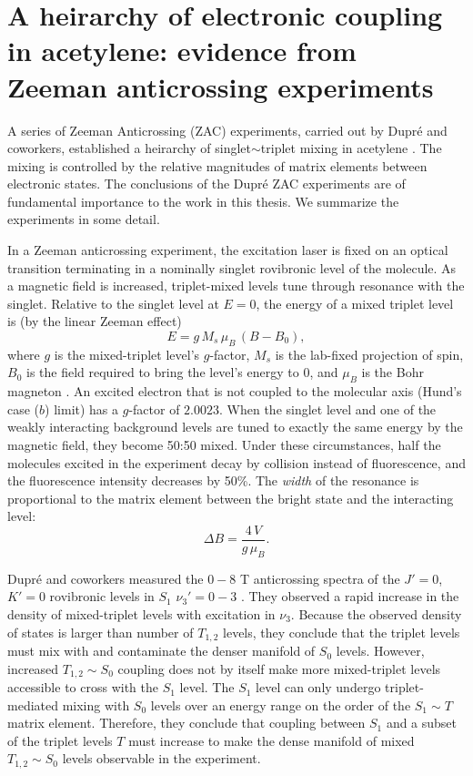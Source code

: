 \documentclass[12pt]{mitthesis}
\begin{document}
\section{A heirarchy of electronic coupling in acetylene: evidence from
  Zeeman anticrossing experiments}

A series of Zeeman Anticrossing (ZAC) experiments, carried out by
Dupr\'{e} and coworkers, established a heirarchy of
singlet$\sim$triplet mixing in acetylene \cite{dupre91, dupre93,
  dupre95a, dupre95b}.  The mixing is controlled by the relative
magnitudes of matrix elements between electronic states.  The
conclusions of the Dupr\'{e} ZAC experiments are of fundamental
importance to the work in this thesis.  We summarize the experiments
in some detail.

In a Zeeman anticrossing experiment, the excitation laser is fixed on
an optical transition terminating in a nominally singlet rovibronic
level of the molecule.  As a magnetic field is increased,
triplet-mixed levels tune through resonance with the singlet.
Relative to the singlet level at $E=0$, the energy of a mixed triplet
level is (by the linear Zeeman effect)
\begin{equation}
  E = g \, M_s \, \mu_B \, (B-B_0),
\end{equation}
where $g$ is the mixed-triplet level's $g$-factor, $M_s$ is the
lab-fixed projection of spin, $B_0$ is the field required to bring the
level's energy to 0, and $\mu_B$ is the Bohr magneton
\cite{lombardi88}.  An excited electron that is not coupled to the
molecular axis (Hund's case ($b$) limit) has a $g$-factor of $2.0023$.
When the singlet level and one of the weakly interacting background
levels are tuned to exactly the same energy by the magnetic field,
they become 50:50 mixed.  Under these circumstances, half the
molecules excited in the experiment decay by collision instead of
fluorescence, and the fluorescence intensity decreases by 50\%.  The
\emph{width} of the resonance is proportional to the matrix element
between the bright state and the interacting level:
\begin{equation}
  \Delta B = \frac{4\,V}{g\,\mu_B}.
\end{equation}

Dupr\'{e} and coworkers measured the $0-8$ T anticrossing spectra of
the $J'=0$, $K'=0$ rovibronic levels in $S_1$ $\nu_3'=0-3$
\cite{dupre91}.  They observed a rapid increase in the density of
mixed-triplet levels with excitation in $\nu_3$.  Because the observed
density of states is larger than number of $T_{1,2}$ levels, they
conclude that the triplet levels must mix with and contaminate the
denser manifold of $S_0$ levels.  However, increased $T_{1,2} \sim
S_0$ coupling does not by itself make more mixed-triplet levels
accessible to cross with the $S_1$ level.  The $S_1$ level can only
undergo triplet-mediated mixing with $S_0$ levels over an energy range
on the order of the $S_1 \sim T$ matrix element.  Therefore, they
conclude that coupling between $S_1$ and a subset of the triplet
levels $T$ must increase to make the dense manifold of mixed $T_{1,2}
\sim S_0$ levels observable in the experiment.
\end{document}
